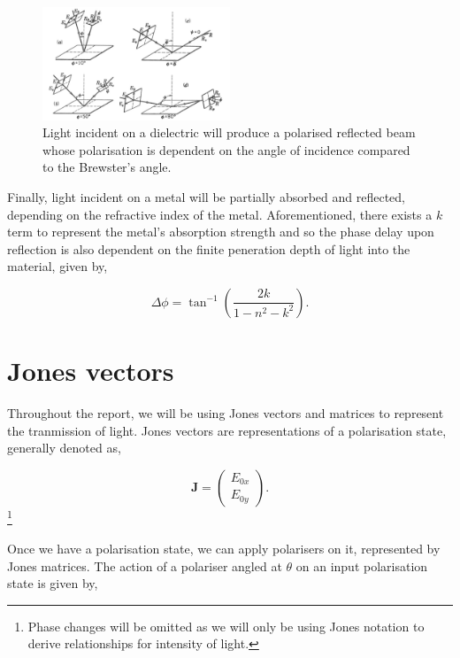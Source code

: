 \documentclass{article}
\begin{document}
\begin{figure}[H]
    \centering
    \includegraphics[width=0.5\textwidth]{polarisationofreflectedbeam.png}
    \caption{Light incident on a dielectric will produce a polarised reflected beam whose
    polarisation is dependent on the angle of incidence compared to the Brewster's angle.}
    \label{fig:reflectedbeam}
\end{figure}

Finally, light incident on a metal will be partially absorbed and reflected, depending on 
the refractive index of the metal. Aforementioned, there exists a $k$ term to represent the
metal's absorption strength and so the phase delay upon reflection is also dependent on the 
finite peneration depth of light into the material, given by,

\begin{equation} \label{eq:metalphasedelay}
    \Delta\phi = \tan^{-1}{\left(\frac{2k}{1-n^2-k^2}\right)}.
\end{equation}

\section{Jones vectors}
Throughout the report, we will be using Jones vectors and matrices to represent the tranmission 
of light. Jones vectors are representations of a polarisation state, generally denoted as,

\begin{equation}
    \textbf{J} = \begin{pmatrix}
        E_{0x} \\
        E_{0y}
    \end{pmatrix}.
\end{equation}\footnote{Phase changes will be omitted as we will only be using Jones notation
to derive relationships for intensity of light.}

Once we have a polarisation state, we can apply polarisers on it, represented by Jones matrices. 
The action of a polariser angled at $\theta$ on an input polarisation state is given by,
\end{document}
